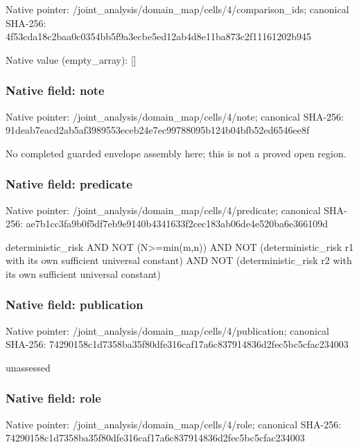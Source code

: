 \documentclass[10pt,a4paper]{article}
\begin{document}
Native pointer: /joint\_analysis/domain\_m\allowbreak{}ap/cells/4/comparison\_id\allowbreak{}s; canonical SHA-256: 4f53cda18c2baa0c0354bb5f\allowbreak{}9a3ecbe5ed12ab4d8e11ba87\allowbreak{}3c2f11161202b945



Native value (empty\_array): []



\subsubsection{Native field: note}


Native pointer: /joint\_analysis/domain\_map/cells/4/note; canonical SHA-256: 91deab7eacd2ab5af3989553\allowbreak{}eceb24e7ec99788095b124b0\allowbreak{}4bfb52ed6546ee8f


No completed guarded envelope assembly here; this is not a proved open region.


\subsubsection{Native field: predicate}


Native pointer: /joint\_analysis/domain\_m\allowbreak{}ap/cells/4/predicate; canonical SHA-256: ae7b1cc3fa9b0f5df7eb9e91\allowbreak{}40b4341633f2cec183ab06de\allowbreak{}4e520ba6e366109d


deterministic\_risk AND NOT (N>=min(m,n)) AND NOT (deterministic\_risk r1 with its own sufficient universal constant) AND NOT (deterministic\_risk r2 with its own sufficient universal constant)


\subsubsection{Native field: publication}


Native pointer: /joint\_analysis/domain\_m\allowbreak{}ap/cells/4/publication; canonical SHA-256: 74290158c1d7358ba35f80df\allowbreak{}e316caf17a6c837914836d2f\allowbreak{}ec5bc5cfac234003


unassessed


\subsubsection{Native field: role}


Native pointer: /joint\_analysis/domain\_map/cells/4/role; canonical SHA-256: 74290158c1d7358ba35f80df\allowbreak{}e316caf17a6c837914836d2f\allowbreak{}ec5bc5cfac234003
\end{document}
